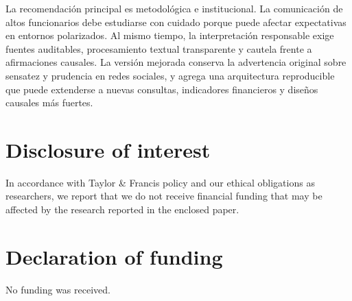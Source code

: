 \documentclass[
]{interact}
\begin{document}
La recomendación principal es metodológica e institucional. La
comunicación de altos funcionarios debe estudiarse con cuidado porque
puede afectar expectativas en entornos polarizados. Al mismo tiempo, la
interpretación responsable exige fuentes auditables, procesamiento
textual transparente y cautela frente a afirmaciones causales. La
versión mejorada conserva la advertencia original sobre sensatez y
prudencia en redes sociales, y agrega una arquitectura reproducible que
puede extenderse a nuevas consultas, indicadores financieros y diseños
causales más fuertes.

\section{Disclosure of interest}\label{disclosure-of-interest}

In accordance with Taylor \& Francis policy and our ethical obligations
as researchers, we report that we do not receive financial funding that
may be affected by the research reported in the enclosed paper.

\section{Declaration of funding}\label{declaration-of-funding}

No funding was received.
\end{document}
